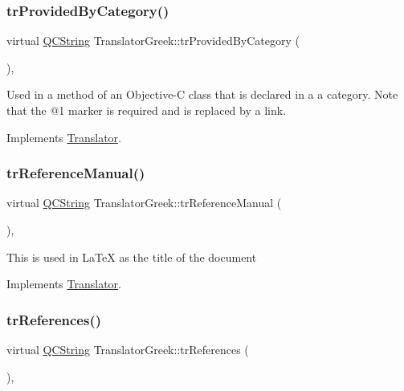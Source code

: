 \subsubsection{\texorpdfstring{trProvidedByCategory()}{trProvidedByCategory()}}
{\footnotesize\ttfamily virtual \mbox{\hyperlink{class_q_c_string}{Q\+C\+String}} Translator\+Greek\+::tr\+Provided\+By\+Category (\begin{DoxyParamCaption}{ }\end{DoxyParamCaption})\hspace{0.3cm}{\ttfamily [inline]}, {\ttfamily [virtual]}}

Used in a method of an Objective-\/C class that is declared in a a category. Note that the @1 marker is required and is replaced by a link. 

Implements \mbox{\hyperlink{class_translator}{Translator}}.

\mbox{\label{class_translator_greek_a18322b04acc6ec820b3d55ed90f1eacc}} 
\subsubsection{\texorpdfstring{trReferenceManual()}{trReferenceManual()}}
{\footnotesize\ttfamily virtual \mbox{\hyperlink{class_q_c_string}{Q\+C\+String}} Translator\+Greek\+::tr\+Reference\+Manual (\begin{DoxyParamCaption}{ }\end{DoxyParamCaption})\hspace{0.3cm}{\ttfamily [inline]}, {\ttfamily [virtual]}}

This is used in La\+TeX as the title of the document 

Implements \mbox{\hyperlink{class_translator}{Translator}}.

\mbox{\label{class_translator_greek_a499e6f16ac7b87a751d8a3703a202e99}} 
\subsubsection{\texorpdfstring{trReferences()}{trReferences()}}
{\footnotesize\ttfamily virtual \mbox{\hyperlink{class_q_c_string}{Q\+C\+String}} Translator\+Greek\+::tr\+References (\begin{DoxyParamCaption}{ }\end{DoxyParamCaption})\hspace{0.3cm}{\ttfamily [inline]}, {\ttfamily [virtual]}}

